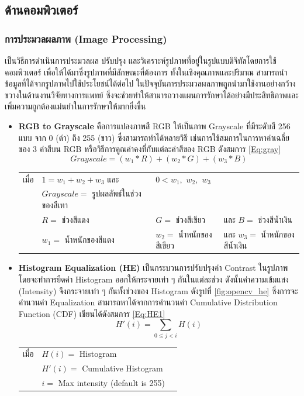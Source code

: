 \documentclass[12pt,oneside,openright,a4paper]{cpe-thai-project}
\begin{document}
\subsection{ด้านคอมพิวเตอร์}
\subsubsection{การประมวลผลภาพ (Image Processing)}
 เป็นวิธีการดำเนินการประมวลผล ปรับปรุง และวิเคราะห์รูปภาพที่อยู่ในรูปแบบดิจิทัลโดยการใช้คอมพิวเตอร์ เพื่อให้ได้มาซึ่งรูปภาพที่มีลักษณะที่ต้องการ ทั้งในเชิงคุณภาพและปริมาณ \cite{15} สามารถนำข้อมูลที่ได้จากรูปภาพไปใช้ประโยชน์ได้ต่อไป ในปัจจุบันการประมวลผลภาพถูกนำมาใช้งานอย่างกว้างขวางในด้านงานวิจัยทางการแพทย์ ซึ่งจะช่วยทำให้สามารถวางแผนการรักษาได้อย่างมีประสิทธิภาพและเพิ่มความถูกต้องแม่นยำในการรักษาให้มากยิ่งขึ้น
\begin{itemize}
\item \textbf{RGB to Grayscale} คือการแปลงภาพสี RGB ให้เป็นภาพ Grayscale ที่มีระดับสี 256 แบบ จาก 0 (ดำ) ถึง 255 (ขาว) ซึ่งสามารถทำได้หลายวิธี เช่นการใช้สมการในการหาค่าเฉลี่ยของ 3 ค่าสีบน RGB \cite{16} หรือวิธีการคูณค่าคงที่กับแต่ละค่าสีของ RGB \cite{17} ดังสมการ \ref{Eq:gray}
\begin{equation}
	Grayscale = (w_{1}*R)+(w_{2}*G)+(w_{3}*B) \label{Eq:gray}
\end{equation}
\hspace*{5mm}
\begin{tabular}{l@{ }l@{ }l@{ }l}
 เมื่อ    & $1 = w_{1}+w_{2}+w_{3}$  และ & $0 < w_{1},$ $w_{2},$ $w_{3}$ \\
        & $Grayscale =$ รูปผลลัพธ์ในช่วงของสีเทา\\
        & $R =$ ช่วงสีแดง & $G =$ ช่วงสีเขียว & และ $B =$ ช่วงสีน้ำเงิน\\
        & $w_{1} =$ น้ำหนักของสีแดง & $w_{2} =$ น้ำหนักของสีเขียว & และ $w_{3} =$ น้ำหนักของสีน้ำเงิน
\end{tabular}

\item\textbf{Histogram Equalization (HE)}
เป็นกระบวนการปรับปรุงค่า Contrast ในรูปภาพ โดยจะทำการยืดค่า Histogram ออกให้กระจายเท่า ๆ กันในแต่ละช่วง ดังนั้นค่าความเข้มแสง (Intensity) จึงกระจายเท่า ๆ กันทั้งช่วงของ Histogram ดังรูปที่ \ref{fig:opencv_he} ซึ่งการจะคำนวนค่า Equalization สามารถหาได้จากการคำนวนค่า Cumulative Distribution Function (CDF) เขียนได้ดังสมการ \ref{Eq:HE1}
\begin{equation}
    H'(i) = \sum_{0\leq j<i} H(i) \label{Eq:HE1}
\end{equation}
\hspace*{5mm}
\begin{tabular}{l@{ }l@{ }l}
 เมื่อ    & $H(i) =$ Histogram \\
        & $H'(i) =$ Cumulative Histogram \\
        & $i =$ Max intensity (default is 255)
\end{tabular}


\end{itemize}
\end{document}
